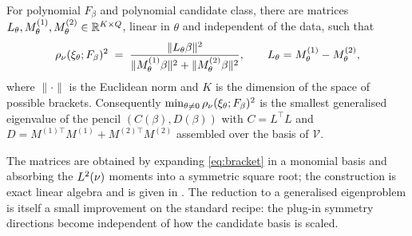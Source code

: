 \begin{lemma}
\label{lem:bilinear}
For polynomial $F_\beta$ and polynomial candidate class, there are matrices
$L_\theta, M^{(1)}_\theta, M^{(2)}_\theta \in \mathbb{R}^{K\times Q}$, linear in
$\theta$ and independent of the data, such that
\begin{equation}
  \rho_\nu(\xi_\theta; F_\beta)^2
  \;=\; \frac{\|L_\theta \beta\|^2}
             {\|M^{(1)}_\theta \beta\|^2 + \|M^{(2)}_\theta \beta\|^2},
  \qquad L_\theta = M^{(1)}_\theta - M^{(2)}_\theta ,
  \label{eq:ratio}
\end{equation}
where $\|\cdot\|$ is the Euclidean norm and $K$ is the dimension of the space of
possible brackets. Consequently
$\min_{\theta \ne 0} \rho_\nu(\xi_\theta;F_\beta)^2$ is the smallest
generalised eigenvalue of the pencil $(C(\beta), D(\beta))$ with
$C = L^{\!\top}L$ and $D = M^{(1)\top}M^{(1)} + M^{(2)\top}M^{(2)}$ assembled
over the basis of $\mathcal V$.
\end{lemma}

The matrices are obtained by expanding \eqref{eq:bracket} in a monomial basis
and absorbing the $L^2(\nu)$ moments into a symmetric square root; the
construction is exact linear algebra and is given in .
The reduction to a generalised eigenproblem is itself a small improvement on
the standard recipe: the plug-in symmetry directions become independent of how
the candidate basis is scaled.
